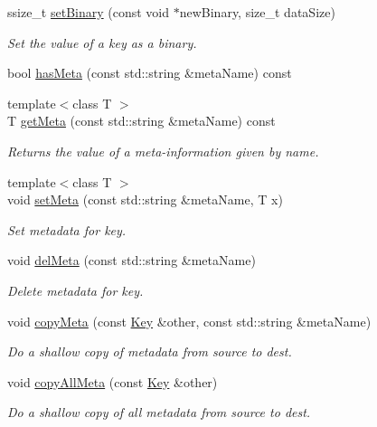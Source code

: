 \begin{DoxyCompactItemize}
ssize\+\_\+t \hyperlink{classkdb_1_1Key_af7211129a4b95f4d1e335dcd06e9bf0a}{set\+Binary} (const void $\ast$new\+Binary, size\+\_\+t data\+Size)
\begin{DoxyCompactList}\small\item\em Set the value of a key as a binary. \end{DoxyCompactList}\item 
bool \hyperlink{classkdb_1_1Key_ae3c3228bd66be9013a8d686e57aed64b}{has\+Meta} (const std\+::string \&meta\+Name) const
\item 
{\footnotesize template$<$class T $>$ }\\T \hyperlink{classkdb_1_1Key_acdd4e81b0565756c99826bf926fd6fe4}{get\+Meta} (const std\+::string \&meta\+Name) const
\begin{DoxyCompactList}\small\item\em Returns the value of a meta-\/information given by name. \end{DoxyCompactList}\item 
{\footnotesize template$<$class T $>$ }\\void \hyperlink{classkdb_1_1Key_a4c5a3d463127ade0b766c4298002daa3}{set\+Meta} (const std\+::string \&meta\+Name, T x)
\begin{DoxyCompactList}\small\item\em Set metadata for key. \end{DoxyCompactList}\item 
void \hyperlink{classkdb_1_1Key_a2305da805095605aca38d53f2733fb57}{del\+Meta} (const std\+::string \&meta\+Name)
\begin{DoxyCompactList}\small\item\em Delete metadata for key. \end{DoxyCompactList}\item 
void \hyperlink{classkdb_1_1Key_a53f6d2196a7f17c4bdc544207bdc5f4c}{copy\+Meta} (const \hyperlink{classkdb_1_1Key}{Key} \&other, const std\+::string \&meta\+Name)
\begin{DoxyCompactList}\small\item\em Do a shallow copy of metadata from source to dest. \end{DoxyCompactList}\item 
void \hyperlink{classkdb_1_1Key_aec0910bf293db33deac6a3f81359cb48}{copy\+All\+Meta} (const \hyperlink{classkdb_1_1Key}{Key} \&other)
\begin{DoxyCompactList}\small\item\em Do a shallow copy of all metadata from source to dest. \end{DoxyCompactList}\item 

\end{DoxyCompactItemize}
